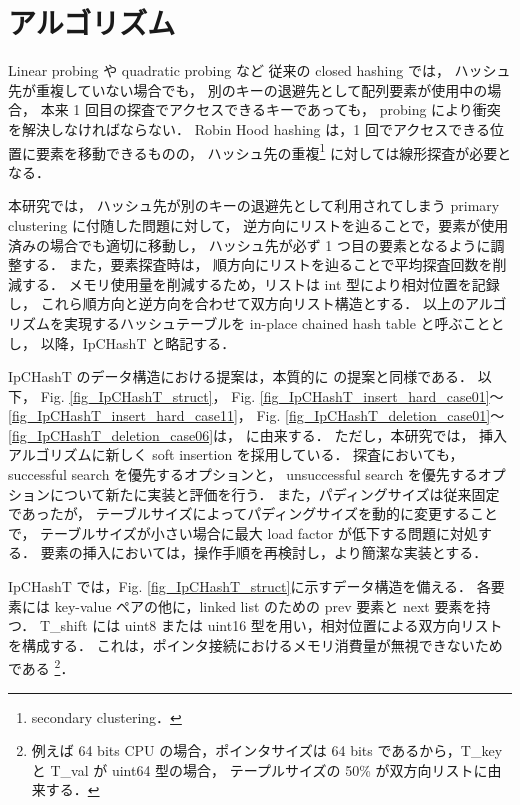 \chapter{アルゴリズム}
\label{chap_Algorism}

Linear probing や quadratic probing など
従来の closed hashing では，
ハッシュ先が重複していない場合でも，
別のキーの退避先として配列要素が使用中の場合，
本来 1 回目の探査でアクセスできるキーであっても，
probing により衝突を解決しなければならない．
Robin Hood hashing は，1 回でアクセスできる位置に要素を移動できるものの，
ハッシュ先の重複\footnote{secondary clustering．} に対しては線形探査が必要となる．

本研究では，
ハッシュ先が別のキーの退避先として利用されてしまう primary clustering に付随した問題に対して，
逆方向にリストを辿ることで，要素が使用済みの場合でも適切に移動し，
ハッシュ先が必ず 1 つ目の要素となるように調整する．
また，要素探査時は，
順方向にリストを辿ることで平均探査回数を削減する．
メモリ使用量を削減するため，リストは int 型により相対位置を記録し，
これら順方向と逆方向を合わせて双方向リスト構造とする．
以上のアルゴリズムを実現するハッシュテーブルを in-place chained hash table と呼ぶこととし，
以降，IpCHashT と略記する．

IpCHashT のデータ構造における提案は，本質的に \cite{ADMIS2017} の提案と同様である．
以下，
Fig. \ref{fig_IpCHashT_struct}，
Fig. \ref{fig_IpCHashT_insert_hard_case01}〜\ref{fig_IpCHashT_insert_hard_case11}，
Fig. \ref{fig_IpCHashT_deletion_case01}〜\ref{fig_IpCHashT_deletion_case06}は，
\cite{ADMIS2017} に由来する．
ただし，本研究では，
挿入アルゴリズムに新しく soft insertion を採用している．
探査においても，
successful search を優先するオプションと，
unsuccessful search を優先するオプションについて新たに実装と評価を行う．
また，パディングサイズは従来固定であったが，
テーブルサイズによってパディングサイズを動的に変更することで，
テーブルサイズが小さい場合に最大 load factor が低下する問題に対処する．
要素の挿入においては，操作手順を再検討し，より簡潔な実装とする．

IpCHashT では，Fig. \ref{fig_IpCHashT_struct}に示すデータ構造を備える．
各要素には key-value ペアの他に，linked list のための prev 要素と next 要素を持つ．
T\_shift には uint8 または uint16 型を用い，相対位置による双方向リストを構成する．
これは，ポインタ接続におけるメモリ消費量が無視できないためである
\footnote{
  例えば 64 bits CPU の場合，ポインタサイズは 64 bits であるから，T\_key と T\_val が uint64 型の場合，
  テープルサイズの 50\% が双方向リストに由来する．
}．

